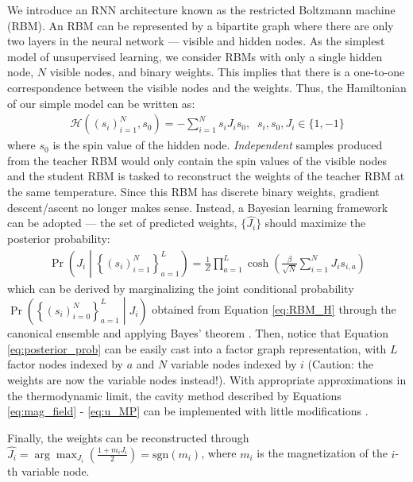 \documentclass[%
 reprint,
 amsmath,amssymb,
 aps,
]{revtex4-2}
\newcommand{\sgn}{\text{sgn}}
\begin{document}
We introduce an RNN architecture known as the restricted Boltzmann machine (RBM). An RBM can be represented by a bipartite graph where there are only two layers in the neural network --- visible and hidden nodes. As the simplest model of unsupervised learning, we consider RBMs with only a single hidden node, $N$ visible nodes, and binary weights. This implies that there is a one-to-one correspondence between the visible nodes and the weights. Thus, the Hamiltonian of our simple model can be written as: 
\begin{align}
    \mathcal{H}\left((s_i)_{i=1}^{N},s_0 \right) = -\sum_{i=1}^{N} s_i J_{i} s_0, \; \; s_i,s_0,J_i \in \{1,-1\} \label{eq:RBM_H}
\end{align}
where $s_0$ is the spin value of the hidden node. \textit{Independent} samples produced from the teacher RBM would only contain the spin values of the visible nodes and the student RBM is tasked to reconstruct the weights of the teacher RBM at the same temperature. Since this RBM has discrete binary weights, gradient descent/ascent no longer makes sense. Instead, a Bayesian learning framework can be adopted --- the set of predicted weights, $\{\hat{J_i}\}$ should maximize the posterior probability:
\begin{align}
\Pr{\left(J_i \middle| \left\{(s_i)_{i=1}^{N}\right\}_{a=1}^L \right)}=\frac{1}{Z}\prod_{a=1}^L \cosh{\left( \frac{\beta}{\sqrt{N}} \sum_{i=1}^{N} J_i s_{i,a} \right)}
\label{eq:posterior_prob}
\end{align}
which can be derived by marginalizing the joint conditional probability $\Pr{\left( \left\{(s_i)_{i=0}^{N}\right\}_{a=1}^L  \middle|  J_i \right) }$ obtained from Equation \ref{eq:RBM_H} through the canonical ensemble and applying Bayes' theorem \cite{huang2021statistical_boltzmannM,huang2021statistical_simplestModel}. Then, notice that Equation \ref{eq:posterior_prob} can be easily cast into a factor graph representation, with $L$ factor nodes indexed by $a$ and $N$ variable nodes indexed by $i$ (Caution: the weights are now the variable nodes instead!). With appropriate approximations in the thermodynamic limit, the cavity method described by Equations \ref{eq:mag_field} - \ref{eq:u_MP} can be implemented with little modifications \cite{huang2016unsupervised,huang2021statistical_boltzmannM}. 

Finally, the weights can be reconstructed through 
$\hat{J_i} = \arg \max_{J_i} \left(\frac{1+m_i J_i}{2}\right) = \sgn{(m_i)}$,
where $m_i$ is the magnetization of the $i$-th variable node.
\end{document}
